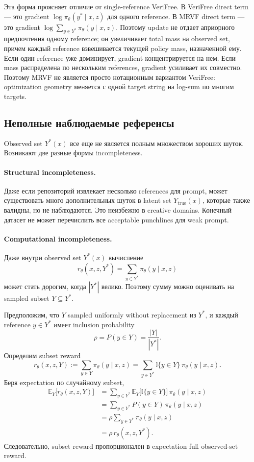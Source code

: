 Эта форма проясняет отличие от single-reference VeriFree. В VeriFree direct term --- это gradient \(\log\pi_{\theta}(y^{*}\mid x,z)\) для одного reference. В MRVF direct term --- это gradient \(\log \sum_{y\in Y^{*}}\pi_{\theta}(y\mid x,z)\). Поэтому update не отдает априорного предпочтения одному reference; он увеличивает total mass на observed set, причем каждый reference взвешивается текущей policy mass, назначенной ему. Если один reference уже доминирует, gradient концентрируется на нем. Если mass распределена по нескольким references, gradient усиливает их совместно. Поэтому MRVF не является просто нотационным вариантом VeriFree: optimization geometry меняется с одной target string на log-sum по многим targets.

\subsection{Неполные наблюдаемые референсы}

Observed set \(Y^{*}(x)\) все еще не является полным множеством хороших шуток. Возникают две разные формы incompleteness.

\paragraph{Structural incompleteness.}
Даже если репозиторий извлекает несколько references для prompt, может существовать много дополнительных шуток в latent set \(Y_{\mathrm{true}}(x)\), которые также валидны, но не наблюдаются. Это неизбежно в creative domains. Конечный датасет не может перечислить все acceptable punchlines для weak prompt.

\paragraph{Computational incompleteness.}
Даже внутри observed set \(Y^{*}(x)\) вычисление
\[
    r_{\theta}(x,z,Y^{*})=\sum_{y\in Y^{*}}\pi_{\theta}(y\mid x,z)
\]
может стать дорогим, когда \(|Y^{*}|\) велико. Поэтому сумму можно оценивать на sampled subset \(Y\subseteq Y^{*}\).

Предположим, что \(Y\) sampled uniformly without replacement из \(Y^{*}\), и каждый reference \(y\in Y^{*}\) имеет inclusion probability
\[
    \rho = P(y\in Y)=\frac{|Y|}{|Y^{*}|}.
\]
Определим subset reward
\[
    r_{\theta}(x,z,Y)
    :=
    \sum_{y\in Y}\pi_{\theta}(y\mid x,z)
    =
    \sum_{y\in Y^{*}}
    \mathbb{I}\{y\in Y\}\,\pi_{\theta}(y\mid x,z).
\]
Беря expectation по случайному subset,
\begin{align*}
    \mathbb{E}_{Y}\big[r_{\theta}(x,z,Y)\big]
     & =
    \sum_{y\in Y^{*}}
    \mathbb{E}_{Y}\big[\mathbb{I}\{y\in Y\}\big]\,
    \pi_{\theta}(y\mid x,z)                  \\
     & =
    \sum_{y\in Y^{*}}
    P(y\in Y)\,\pi_{\theta}(y\mid x,z)       \\
     & =
    \rho
    \sum_{y\in Y^{*}}\pi_{\theta}(y\mid x,z) \\
     & =
    \rho\,r_{\theta}(x,z,Y^{*}).
\end{align*}
Следовательно, subset reward пропорционален в expectation full observed-set reward.

